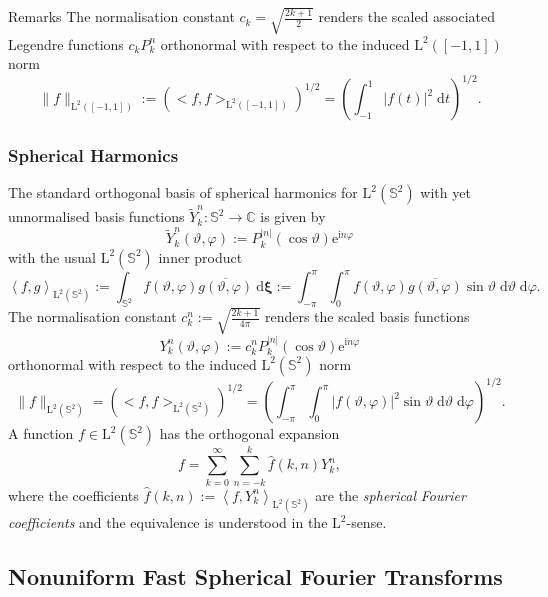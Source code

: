 \begin{DoxyRemark}{Remarks}
The normalisation constant $ c_k = \sqrt{\frac{2k+1}{2}}$ renders the scaled associated Legendre functions $c_k P_k^n$ orthonormal with respect to the induced $\text{L}^2\left([-1,1]\right)$ norm \[ \|f\|_{\text{L}^2\left([-1,1]\right)} := \left(<f,f>_{\text{L}^2\left([-1,1]\right)}\right)^{1/2} = \left(\int_{-1}^{1} |f(t)|^2 \; \text{d} t\right)^{1/2}. \]
\end{DoxyRemark}
\hypertarget{group__nfsft_sh}{}\subsubsection{Spherical Harmonics}\label{group__nfsft_sh}
The standard orthogonal basis of spherical harmonics for $\text{L}^2 \left(\mathbb{S}^2\right)$ with yet unnormalised basis functions $\tilde{Y}_k^n : \mathbb{S}^2 \rightarrow \mathbb{C}$ is given by \[ \tilde{Y}_k^n(\vartheta,\varphi) := P_k^{|n|}(\cos\vartheta) \mathrm{e}^{\mathrm{i} n \varphi} \] with the usual $\text{L}^2\left(\mathbb{S}^2\right)$ inner product \[ \left< f,g \right>_{\mathrm{L}^2\left(\mathbb{S}^2\right)} := \int_{\mathbb{S}^2} f(\vartheta,\varphi) \overline{g(\vartheta,\varphi)} \: \mathrm{d} \mathbf{\xi} := \int_{-\pi}^{\pi} \int_{0}^{\pi} f(\vartheta,\varphi) \overline{g(\vartheta,\varphi)} \sin \vartheta \; \mathrm{d} \vartheta \; \mathrm{d} \varphi. \] The normalisation constant $c_k^n := \sqrt{\frac{2k+1}{4\pi}}$ renders the scaled basis functions \[ Y_k^n(\vartheta,\varphi) := c_k^n P_k^{|n|}(\cos\vartheta) \mathrm{e}^{\mathrm{i} n \varphi} \] orthonormal with respect to the induced $\text{L}^2\left(\mathbb{S}^2 \right)$ norm \[ \|f\|_{\text{L}^2\left(\mathbb{S}^2\right)} = \left(<f,f>_{\text{L}^2\left(\mathbb{S}^2\right)}\right)^{1/2} = \left(\int_{-\pi}^{\pi} \int_{0}^{\pi} |f(\vartheta,\varphi)|^2 \sin \vartheta \; \mathrm{d} \vartheta \; \mathrm{d} \varphi\right)^{1/2}. \] A function $f \in \mathrm{L}^2\left(\mathbb{S}^2\right)$ has the orthogonal expansion \[ f = \sum_{k=0}^{\infty} \sum_{n=-k}^{k} \hat{f}(k,n) Y_k^n, \] where the coefficients $\hat{f}(k,n) := \left< f, Y_k^{n} \right>_{\mathrm{L}^2\left(\mathbb{S}^2\right)}$ are the {\itshape spherical} {\itshape Fourier} {\itshape coefficients} and the equivalence is understood in the $\mathrm{L}^2$-\/sense.\hypertarget{group__nfsft_nfsfts}{}\subsection{Nonuniform Fast Spherical Fourier Transforms}\label{group__nfsft_nfsfts}
